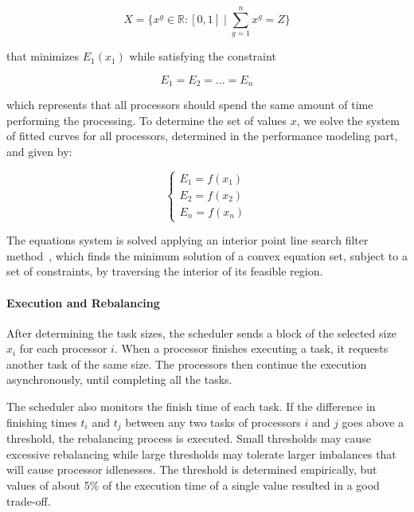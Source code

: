 \documentclass[journal]{IEEEtran}
\begin{document}
\begin{equation}
	X = \{ x^g \in \mathbb{R}:[0,1] \mid \sum_{g=1}^n x^g = Z \}
	\label{eq: totalResultado}
\end{equation}

that minimizes $E_1(x_1)$ while satisfying the constraint

\begin{equation}
	E_{1} = E_{2} = ...= E_{n}
	\label{eq: Restricao}
\end{equation}

which represents that all processors should spend the same amount of time
performing the processing. To determine the set of values $x$, we solve the
system of fitted curves for all processors, determined in the performance
modeling part, and given by:

\begin{equation}
	\left\lbrace
	\begin{array}{ll}
		\displaystyle E_{1} = f(x_{1})  \\
		\displaystyle E_{2} = f(x_{2})   \\
		\displaystyle E_{n} = f(x_{n}) 
		\label{eq: system}
	\end{array}
	\right.
\end{equation}

The equations system is solved applying an interior point line search filter
method~\cite{point}, which finds the minimum solution of a convex equation set,
subject to a set of constraints, by traversing the interior of its
feasible region.


\vspace{0.2cm}
\paragraph*{Execution and Rebalancing}  

After determining the task sizes, the scheduler sends a block of the selected
size $x_i$ for each processor $i$. When a processor finishes executing a task,
it requests another task of the same size. The processors then continue the
execution asynchronously, until completing all the tasks.

The scheduler also monitors the finish time of each task. If the difference in
finishing times $t_i$ and $t_j$ between any two tasks of processors $i$ and $j$
goes above a threshold, the rebalancing process is executed. Small thresholds
may cause excessive rebalancing while large thresholds may tolerate larger
imbalances that will cause processor idlenesses. The threshold is determined
empirically, but values of about 5\% of the execution time of a single value
resulted in a good trade-off.
\end{document}
